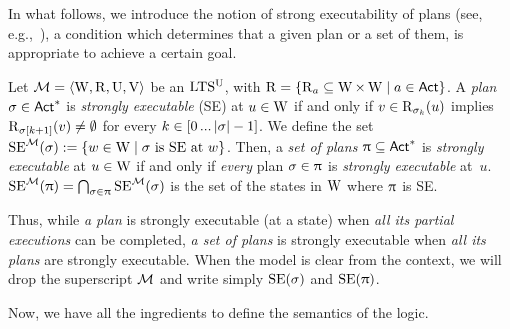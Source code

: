 \medskip

In what follows, we introduce the notion of strong executability of plans (see, e.g.,~\cite{Wang15lori,AFSVQ23report}), a condition which determines that a given plan or a set of them, is appropriate to achieve a certain goal.

\medskip


\begin{definition}\label{def:plans-exec}
Let $\mathcal{M}=\langle \operatorname{W}, \operatorname{R}, \operatorname{U}, \operatorname{V} \rangle$ be an $\textup{LTS$^\text{\textup{U}}$}$, with $\operatorname{R}=\{ \operatorname{R}_a\subseteq \operatorname{W} \times \operatorname{W} \mid a\in{\rm \sf Act} \}$. A \emph{plan} $\sigma \in {\rm \sf Act}^*$ is \emph{strongly executable} (SE) at $u \in \operatorname{W}$ if and only if $v \in \operatorname{R}_{\sigma_k}(u)$ implies $\operatorname{R}_{\sigma[k+1]}(v) \neq \emptyset$ for every $k \in [0 \mathop{...} |{\sigma}|-1]$.
We define the set $\operatorname{SE}^{\mathcal{M}}(\sigma):= \{ w\in\operatorname{W} \mid \sigma \mbox{ is SE at }w \}$.
Then, a \emph{set of plans} $\uppi \subseteq {\rm \sf Act}^*$ is \emph{strongly executable} at $u \in \operatorname{W}$ if and only if \emph{every} plan $\sigma \in \uppi$ is \emph{strongly executable} at~$u$.
$\operatorname{SE}^{\mathcal{M}}(\uppi) = \bigcap_{\sigma \in \uppi} \operatorname{SE}^{\mathcal{M}}(\sigma)$ is the set of the states in $\operatorname{W}$ where $\uppi$ is SE.
\end{definition}
\medskip


Thus, while \emph{a plan} is strongly executable (at a state) when \emph{all its partial executions} %
can be completed, \emph{a set of plans} is strongly executable when \emph{all its plans} are strongly executable. When the model is clear from the context, we will drop the superscript $\mathcal{M}$ and write simply $\operatorname{SE}(\sigma)$ and $\operatorname{SE}(\uppi)$.


Now, we have all the ingredients to define the semantics of the logic.
\medskip


